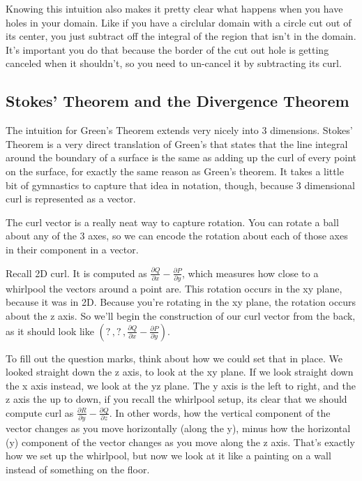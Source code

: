 \documentclass[12pt, letterpaper]{article}
\begin{document}
Knowing this intuition also makes it pretty clear what happens when you have holes in your domain.
Like if you have a circlular domain with a circle cut out of its center, you just subtract off the integral of the region that isn't in the domain.
It's important you do that because the border of the cut out hole is getting canceled when it shouldn't, so you need to un-cancel it by subtracting its curl.

\subsection{Stokes' Theorem and the Divergence Theorem}
The intuition for Green's Theorem extends very nicely into 3 dimensions.
Stokes' Theorem is a very direct translation of Green's that states that the line integral around the boundary of a surface is the same as adding up the curl of every point on the surface,
for exactly the same reason as Green's theorem. It takes a little bit of gymnastics to capture that idea in notation, though, because 3 dimensional curl is represented as a vector.

The curl vector is a really neat way to capture rotation. 
You can rotate a ball about any of the 3 axes, so we can encode the rotation about each of those axes in their component in a vector.

Recall 2D curl. 
It is computed as $\frac{\partial Q}{\partial x} - \frac{\partial P}{\partial y}$, which measures how close to a whirlpool the vectors around a point are.
This rotation occurs in the xy plane, because it was in 2D.
Because you're rotating in the xy plane, the rotation occurs about the z axis.
So we'll begin the construction of our curl vector from the back, as it should look like $(?\, , ?\, , \frac{\partial Q}{\partial x} - \frac{\partial P}{\partial y})$.

To fill out the question marks, think about how we could set that in place.
We looked straight down the z axis, to look at the xy plane.
If we look straight down the x axis instead, we look at the yz plane.
The y axis is the left to right, and the z axis the up to down, if you recall the whirlpool setup, its clear that we should compute curl as $\frac{\partial R}{\partial y} - \frac{\partial Q}{\partial z}$.
In other words, how the vertical component of the vector changes as you move horizontally (along the y), minus how the horizontal (y) component of the vector changes as you move along the z axis.
That's exactly how we set up the whirlpool, but now we look at it like a painting on a wall instead of something on the floor.
\end{document}
